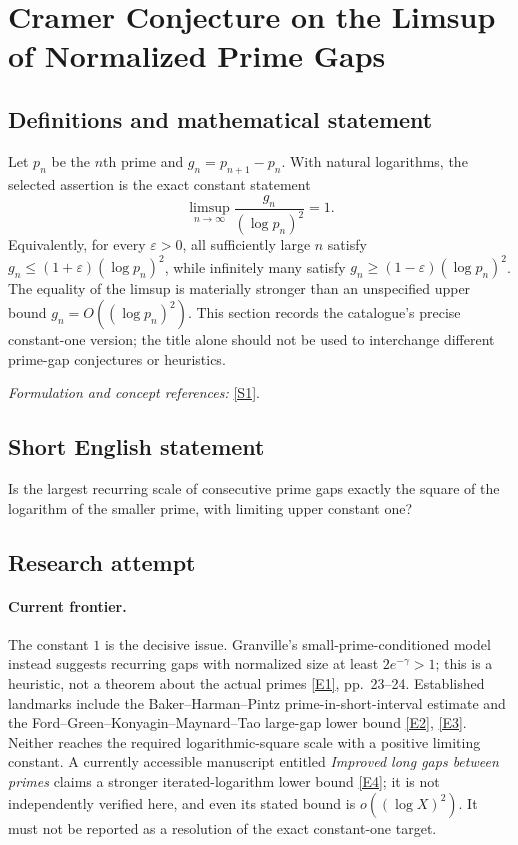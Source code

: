\documentclass[11pt,a4paper]{article}
\newcommand{\eps}{\varepsilon}
\newcommand{\sref}[2]{\hyperlink{source:#1:#2}{[S#2]}}
\newcommand{\eref}[2]{\hyperlink{extra:#1:#2}{[E#2]}}
\newif\ifshowcatalogue
\newcommand{\cataloguescope}[1]{\ifshowcatalogue
 \paragraph{Exact scope in the supplied catalogue.}
 \begin{quote}\small #1\end{quote}\fi}
\numberwithin{equation}{section}
\begin{document}
\setcounter{section}{159}
\clearpage
\section{\texorpdfstring{Cramer Conjecture on the Limsup of Normalized Prime Gaps}{Cramer Conjecture on the Limsup of Normalized Prime Gaps}}\label{160}
\subsection{Definitions and mathematical statement}
Let $p_n$ be the $n$th prime and $g_n=p_{n+1}-p_n$. With natural logarithms, the selected assertion is the exact constant statement
\[
 \limsup_{n\to\infty}\frac{g_n}{(\log p_n)^2}=1.
\]
Equivalently, for every $\eps>0$, all sufficiently large $n$ satisfy
$g_n\le(1+\eps)(\log p_n)^2$, while infinitely many satisfy
$g_n\ge(1-\eps)(\log p_n)^2$. The equality of the limsup is materially stronger than an unspecified upper bound $g_n=O((\log p_n)^2)$. This section records the catalogue's precise constant-one version; the title alone should not be used to interchange different prime-gap conjectures or heuristics.
\par\smallskip\textit{Formulation and concept references:} \sref{160}{1}.
\cataloguescope{Prove that lim sup\_\{n -> infinity\} (p\_\{n+1\} - p\_n) / (log p\_n)\textasciicircum{}2 = 1, where p\_n is the n-th prime.}
\subsection{Short English statement}
Is the largest recurring scale of consecutive prime gaps exactly the square of the logarithm of the smaller prime, with limiting upper constant one?
\subsection{Research attempt}

\paragraph{Current frontier.}
The constant $1$ is the decisive issue. Granville's small-prime-conditioned
model instead suggests recurring gaps with normalized size at least
$2e^{-\gamma}>1$; this is a heuristic, not a theorem about the actual
primes \eref{160}{1}, pp.~23--24. Established landmarks include the
Baker--Harman--Pintz prime-in-short-interval estimate and the
Ford--Green--Konyagin--Maynard--Tao large-gap lower bound
\eref{160}{2}, \eref{160}{3}. Neither reaches the required logarithmic-square
scale with a positive limiting constant. A currently accessible manuscript
entitled \emph{Improved long gaps between primes} claims a stronger
iterated-logarithm lower bound \eref{160}{4}; it is not independently
verified here, and even its stated bound is $o((\log X)^2)$. It must not be
reported as a resolution of the exact constant-one target.
\end{document}

